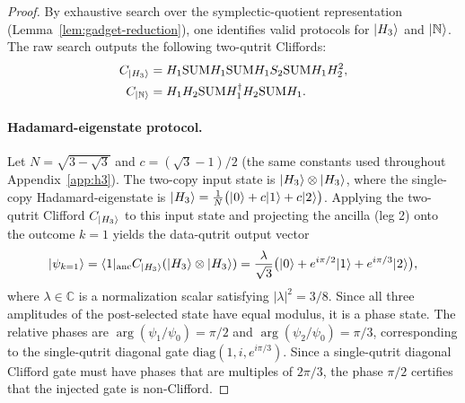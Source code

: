 \documentclass[11pt]{article}
\theoremstyle{definition}
\newcommand{\microspace}{\mspace{0.5mu}}
\newcommand{\ket}[1]{\lvert\microspace #1 \microspace \rangle}
\newcommand{\bra}[1]{\langle\microspace #1 \microspace \rvert}
\newcommand{\complex}{\mathbb{C}}
\newcommand{\Hth}{\ket{H_3}}
\newcommand{\Norrell}{\ket{\mathbb{N}}}
\begin{document}
	\begin{proof}
		By exhaustive search over the symplectic-quotient representation (Lemma~\ref{lem:gadget-reduction}), one identifies valid protocols for $\Hth$ and $\Norrell$. The raw search outputs the following two-qutrit Cliffords:
		\begin{equation}\label{eq:two-copy-protocols}
			\begin{aligned}
				C_{\Hth}    &= H_1 \mathrm{SUM} H_1 \mathrm{SUM} H_1 S_2 \mathrm{SUM} H_1 H_2^2, \\
				C_{\Norrell} &= H_1 H_2 \mathrm{SUM} H_1^\dagger H_2 \mathrm{SUM} H_1.
			\end{aligned}
		\end{equation}

		\paragraph{Hadamard-eigenstate protocol.}
		Let $N = \sqrt{3 - \sqrt{3}}$ and $c = (\sqrt{3}-1)/2$ (the same constants used throughout Appendix~\ref{app:h3}). The two-copy input state is $\Hth \otimes \Hth$, where the single-copy Hadamard-eigenstate is $\Hth = \frac{1}{N} \big(\ket{0} + c\ket{1} + c\ket{2}\big)$. Applying the two-qutrit Clifford $C_{\Hth}$ to this input state and projecting the ancilla (leg 2) onto the outcome $k = 1$ yields the data-qutrit output vector
		\begin{equation}\label{eq:H3-output}
			\ket{\psi_{k=1}} = \bra{1}_{\mathrm{anc}} C_{\Hth} (\Hth \otimes \Hth) = \frac{\lambda}{\sqrt{3}} \big(\ket{0} + e^{i\pi/2}\ket{1} + e^{i\pi/3}\ket{2}\big),
		\end{equation}
		where $\lambda \in \complex$ is a normalization scalar satisfying $|\lambda|^2 = 3/8$. Since all three amplitudes of the post-selected state have equal modulus, it is a phase state. The relative phases are $\arg(\psi_1 / \psi_0) = \pi/2$ and $\arg(\psi_2 / \psi_0) = \pi/3$, corresponding to the single-qutrit diagonal gate $\mathrm{diag}(1, i, e^{i\pi/3})$. Since a single-qutrit diagonal Clifford gate must have phases that are multiples of $2\pi/3$, the phase $\pi/2$ certifies that the injected gate is non-Clifford.


\end{proof}
\end{document}
